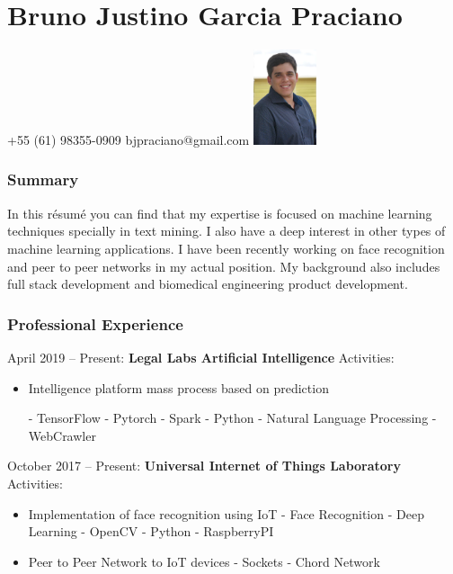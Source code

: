 \documentclass{tccv_full}
\begin{document}
\part{Bruno Justino Garcia Praciano}
{+55 (61) 98355-0909}
{bjpraciano@gmail.com}
{\mbox{\includegraphics[width=0.14\textwidth, trim=0 0cm 0 0]{CV1}}}

\vspace{1.9cm}

\section{Summary}

In this r\'esum\'e you can find that my expertise is focused on machine learning techniques specially in text mining. I also have a deep interest in other types of machine learning applications. I have been recently working on face recognition and peer to peer networks in my actual position. My background also includes full stack development and biomedical engineering product development.

\vspace{-0.4cm}
\section{Professional Experience}

		{\large April 2019 -- Present:	\textbf{Legal Labs Artificial Intelligence}}
	Activities:
	\begin{itemize}
		\item{Intelligence platform mass process based on prediction}

		{\small
			\subitem - TensorFlow
			\subitem - Pytorch
			\subitem - Spark
			\subitem - Python
			\subitem - Natural Language Processing
			\subitem - WebCrawler
		} 
	\end{itemize}
	{\large October 2017 -- Present:	\textbf{Universal Internet of Things Laboratory}}
	Activities:
	\begin{itemize}
		\item \textsf{Implementation of face recognition using IoT}
		{\small
			\subitem - Face Recognition
			\subitem - Deep Learning
			\subitem - OpenCV
			\subitem - Python
			\subitem - RaspberryPI
		} 
		\item \textsf{Peer to Peer Network to IoT devices}
		{\small
			\subitem - Sockets
			\subitem - Chord Network
		}	

	\end{itemize}
\end{document}
